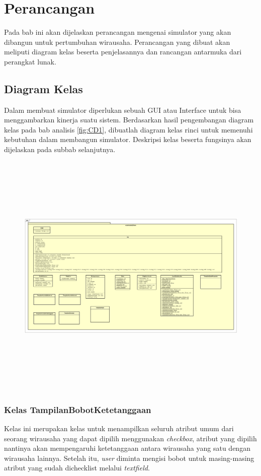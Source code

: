 \chapter{Perancangan}
\label{chap:perancangan}

Pada bab ini akan dijelaskan perancangan mengenai simulator yang akan dibangun untuk pertumbuhan wirausaha. Perancangan yang dibuat akan meliputi diagram kelas beserta penjelasannya dan rancangan antarmuka dari perangkat lunak.


\section{Diagram Kelas}
\label{sec:perancangankelas}

Dalam membuat simulator diperlukan sebuah GUI atau Interface untuk bisa menggambarkan kinerja suatu sistem. Berdasarkan hasil pengembangan diagram kelas pada bab analisis \ref{fig:CD1}, dibuatlah diagram kelas rinci untuk memenuhi kebutuhan dalam membangun simulator. Deskripsi kelas beserta fungsinya akan dijelaskan pada subbab selanjutnya.

\begin{figure} [H]
	\centering  
	\includegraphics[width=18cm, height=12cm]{ClassDiagram3} 
	\label{fig:classdiagram2} 
\end{figure}


\subsection{Kelas TampilanBobotKetetanggaan}
Kelas ini merupakan kelas untuk menampilkan seluruh atribut umum dari seorang wirausaha yang dapat dipilih menggunakan \textit{checkbox}, atribut yang dipilih nantinya akan mempengaruhi ketetanggaan antara wirausaha yang satu dengan wirausaha lainnya. Setelah itu, \textit{user} diminta mengisi bobot untuk masing-masing atribut yang sudah dichecklist melalui \textit{textfield}.

